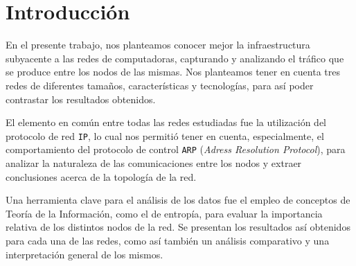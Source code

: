 
\section{Introducción}

En el presente trabajo, nos planteamos conocer mejor la infraestructura
subyacente a las redes de computadoras, capturando y analizando el tráfico que
se produce entre los nodos de las mismas. Nos planteamos tener en cuenta tres
redes de diferentes tamaños, características y tecnologías, para así poder
contrastar los resultados obtenidos.

El elemento en común entre todas las redes estudiadas fue la utilización del
protocolo de red \texttt{IP}, lo cual nos permitió tener en cuenta,
especialmente, el comportamiento del protocolo de control \texttt{ARP}
(\textit{Adress Resolution Protocol}), para analizar la naturaleza de las
comunicaciones entre los nodos y extraer conclusiones acerca de la topología
de la red.

Una herramienta clave para el análisis de los datos fue el empleo de conceptos
de Teoría de la Información, como el de entropía, para evaluar la importancia
relativa de los distintos nodos de la red. Se presentan los resultados así
obtenidos para cada una de las redes, como así también un análisis comparativo
y una interpretación general de los mismos.
